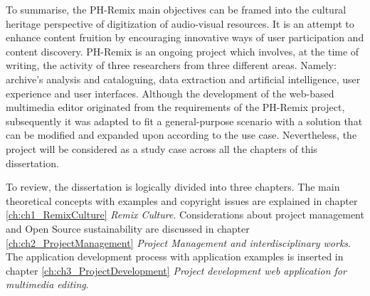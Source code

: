 To summarise, the PH-Remix main objectives can be framed into the cultural heritage perspective of digitization of audio-visual resources. It is an attempt to enhance content fruition by encouraging innovative ways of user participation and content discovery. PH-Remix is an ongoing project which involves, at the time of writing, the activity of three researchers from three different areas. Namely: archive’s analysis and cataloguing, data extraction and artificial intelligence, user experience and user interfaces.
Although the development of the web-based multimedia editor originated from the requirements of the PH-Remix project, subsequently it was adapted to fit a general-purpose scenario with a solution that can be modified and expanded upon according to the use case. Nevertheless, the project will be considered as a study case across all the chapters of this dissertation.

To review, the dissertation is logically divided into three chapters.
The main theoretical concepts with examples and copyright issues are explained in chapter \ref{ch:ch1_RemixCulture} \emph{Remix Culture}.
Considerations about project management and Open Source sustainability are discussed in chapter \ref{ch:ch2_ProjectManagement} \emph{Project Management and interdisciplinary works}.
The application development process with application examples is inserted in chapter \ref{ch:ch3_ProjectDevelopment} \emph{Project development web application for multimedia editing}.
